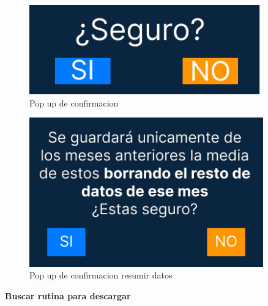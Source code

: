 \begin{figure}[H]
\begin{minipage}{0.45\textwidth}
      \label{fig:Opciones de perfil usuario}
   \end{minipage}%
   \hspace{0.5cm}
   \begin{minipage}{0.45\textwidth}
      \centering
      \includegraphics[width=0.9\textwidth]{fotos/Frame 38.png}
      \caption{Pop up de confirmacion}
      \label{fig:Pop up de confirmacion}
   \end{minipage}
\end{figure}

\begin{figure}[H]
   \centering
   \begin{minipage}{0.45\textwidth}
      \centering
      \includegraphics[width=0.9\textwidth]{fotos/Frame 39.png}
      \caption{Pop up de confirmacion resumir datos}
      \label{fig:Pop up de confirmacion resumir datos}
   \end{minipage}
\end{figure}

\newpage

\textbf{Buscar rutina para descargar}

